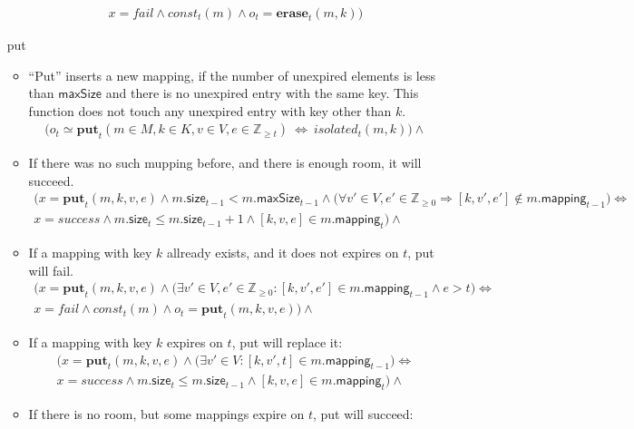 \documentclass{article}
\renewcommand{\o}[1]{\ensuremath{\mathbf{#1}}}
\newcommand{\p}[1]{\ensuremath{\mathit{#1}}}
\newcommand{\s}[1]{\ensuremath{\mathsf{#1}}}
\newcommand{\nintset}{\ensuremath{\mathds{Z}_{\ge 0}}}
\newcommand{\moreset}[1]{\ensuremath{\mathds{Z}_{\ge #1}}}
\begin{document}
\begin{itemize}
\begin{itemize}
\begin{gather}
      x=fail \wedge \p{const}_t(m) \wedge o_t=\o{erase}_t(m, k)\Big)
      \label{eq:erase2}
    \end{gather}
  \end{itemize}
\item[put]
  \begin{itemize}
  \item ``Put'' inserts a new mapping, if the number of unexpired elements is less than \s{maxSize} and there is no unexpired entry with the same key.
    This function does not touch any unexpired entry with key other than $k$.
    \begin{gather*}
      \Big(o_t \simeq \o{put}_t(m\in M, k\in K, v\in V, e\in \moreset{t}) ~\Leftrightarrow~ \p{isolated}_t(m, k)\Big) \wedge
    \end{gather*}
  \item If there was no such mupping before, and there is enough room, it will succeed.
    \begin{gather}
      \Big(x=\o{put}_t(m, k, v, e) \wedge m.\s{size}_{t-1} < m.\s{maxSize}_{t-1} \wedge \big(\forall v'\in V, e'\in \nintset \Rightarrow [k, v', e'] \not\in m.\s{mapping}_{t-1}\big) \Leftrightarrow \nonumber\\
      x=success \wedge m.\s{size}_t \le m.\s{size}_{t-1}+1 \wedge [k, v, e] \in m.\s{mapping}_t\Big)\wedge
      \label{eq:put1}
    \end{gather}
  \item If a mapping with key $k$ allready exists, and it does not expires on $t$, put will fail.
    \begin{gather}
      \Big(x=\o{put}_t(m, k, v, e) \wedge \big(\exists v'\in V, e'\in \nintset: [k, v', e']\in m.\s{mapping}_{t-1} \wedge e > t\big) \Leftrightarrow\nonumber\\
      x=fail \wedge \p{const}_t(m) \wedge o_t = \o{put}_t(m,k,v,e)\Big)\wedge
      \label{eq:put2}
    \end{gather}
  \item If a mapping with key $k$ expires on $t$, put will replace it:
    \begin{gather}
      \Big(x=\o{put}_t(m, k, v, e) \wedge \big(\exists v'\in V: [k, v', t]\in m.\s{mapping}_{t-1}\big) \Leftrightarrow\nonumber\\
      x=success \wedge m.\s{size}_t \le m.\s{size}_{t-1} \wedge [k, v, e] \in m.\s{mapping}_t\Big)\wedge
      \label{eq:put3}
    \end{gather}
  \item If there is no room, but some mappings expire on $t$, put will succeed:

\end{itemize}
\end{itemize}
\end{document}

